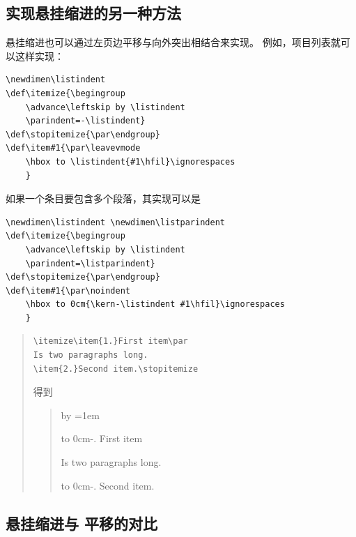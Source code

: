 \documentclass[a4paper]{rapport3}
\newenvironment{disp}{\begin{quotation}}{\end{quotation}}
\newenvironment{example}{\begin{quotation}}{\end{quotation}}
\begin{document}
\subsection{实现悬挂缩进的另一种方法}

悬挂缩进也可以通过左页边平移与向外突出相结合来实现。
例如，项目列表就可以这样实现：
\begin{verbatim}
\newdimen\listindent
\def\itemize{\begingroup
    \advance\leftskip by \listindent
    \parindent=-\listindent}
\def\stopitemize{\par\endgroup}
\def\item#1{\par\leavevmode
    \hbox to \listindent{#1\hfil}\ignorespaces
    }
\end{verbatim}
如果一个条目要包含多个段落，其实现可以是
\begin{verbatim}
\newdimen\listindent \newdimen\listparindent
\def\itemize{\begingroup
    \advance\leftskip by \listindent
    \parindent=\listparindent}
\def\stopitemize{\par\endgroup}
\def\item#1{\par\noindent
    \hbox to 0cm{\kern-\listindent #1\hfil}\ignorespaces
    }
\end{verbatim}

\begin{example}
\begin{verbatim}
\itemize\item{1.}First item\par
Is two paragraphs long.
\item{2.}Second item.\stopitemize
\end{verbatim}
得到
\begin{disp}
\def\itemize{\begingroup
    \advance\leftskip by \parindent
    \parindent=1em\relax}
\def\stopitemize{\par\endgroup}
\def\item#1{\par\noindent
    \hbox to 0cm{\kern-\parindent #1\hfil}\ignorespaces
    }
\itemize\item{1.}First item\par
Is two paragraphs long.
\item{2.}Second item.\stopitemize
\end{disp}
\end{example}

\subsection{悬挂缩进与  平移的对比}
\end{document}
